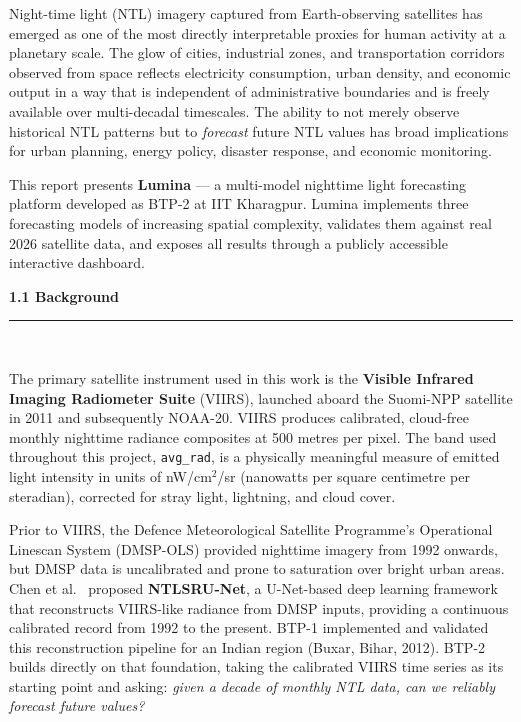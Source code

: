 \documentclass[12pt,a4paper]{report}
\begin{document}
Night-time light (NTL) imagery captured from Earth-observing satellites has emerged as one of the most directly interpretable proxies for human activity at a planetary scale. The glow of cities, industrial zones, and transportation corridors observed from space reflects electricity consumption, urban density, and economic output in a way that is independent of administrative boundaries and is freely available over multi-decadal timescales. The ability to not merely observe historical NTL patterns but to \emph{forecast} future NTL values has broad implications for urban planning, energy policy, disaster response, and economic monitoring.

This report presents \textbf{Lumina} --- a multi-model nighttime light forecasting platform developed as BTP-2 at IIT Kharagpur. Lumina implements three forecasting models of increasing spatial complexity, validates them against real 2026 satellite data, and exposes all results through a publicly accessible interactive dashboard.

\vspace{0.5cm}
\begin{center}
    \hypertarget{sec:s11}{}%
    {\large \textbf{1.1 Background}}\\[0.3cm]
    \noindent\rule{\linewidth}{0.4pt}\\[0.5cm]
\end{center}

The primary satellite instrument used in this work is the \textbf{Visible Infrared Imaging Radiometer Suite} (VIIRS), launched aboard the Suomi-NPP satellite in 2011 and subsequently NOAA-20. VIIRS produces calibrated, cloud-free monthly nighttime radiance composites at 500 metres per pixel. The band used throughout this project, \texttt{avg\_rad}, is a physically meaningful measure of emitted light intensity in units of nW/cm$^2$/sr (nanowatts per square centimetre per steradian), corrected for stray light, lightning, and cloud cover.

Prior to VIIRS, the Defence Meteorological Satellite Programme's Operational Linescan System (DMSP-OLS) provided nighttime imagery from 1992 onwards, but DMSP data is uncalibrated and prone to saturation over bright urban areas. Chen et al.\ \cite{chen2024} proposed \textbf{NTLSRU-Net}, a U-Net-based deep learning framework that reconstructs VIIRS-like radiance from DMSP inputs, providing a continuous calibrated record from 1992 to the present. BTP-1 implemented and validated this reconstruction pipeline for an Indian region (Buxar, Bihar, 2012). BTP-2 builds directly on that foundation, taking the calibrated VIIRS time series as its starting point and asking: \emph{given a decade of monthly NTL data, can we reliably forecast future values?}
\end{document}
